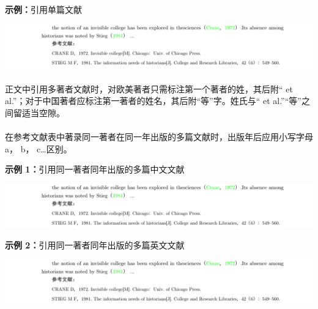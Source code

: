 \documentclass[twoside]{article}%
\begin{document}
\textbf{示例：}引用单篇文献

\noindent\hspace{-2.5cm}\includegraphics[width=\paperwidth,page=1]{tngbcitationaynew.pdf}
%
%
%

\paragraph{} 正文中引用多著者文献时，对欧美著者只需标注第一个著者的姓，其后附“ et al.”；对于中国著者应标注第一著者的姓名，其后附“等”字。姓氏与“ et al.”“等”之间留适当空隙。

\paragraph{} 在参考文献表中著录同一著者在同一年出版的多篇文献时，出版年后应用小写字母 a， b， c…区别。

\textbf{示例 1：}引用同一著者同年出版的多篇中文文献

\noindent\hspace{-2.5cm}\includegraphics[width=\paperwidth,page=2]{tngbcitationaynew.pdf}
%

\textbf{示例 2：}引用同一著者同年出版的多篇英文文献

\noindent\hspace{-2.5cm}\includegraphics[width=\paperwidth,page=3]{tngbcitationaynew.pdf}
\end{document}
